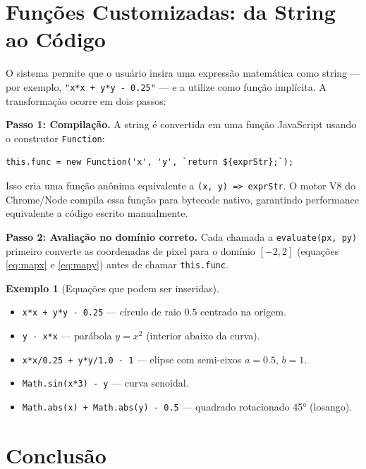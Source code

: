 \documentclass[11pt,a4paper]{article}
\theoremstyle{plain}
\theoremstyle{definition}
\newtheorem{example}[theorem]{Exemplo}
\begin{document}
\section{Funções Customizadas: da String ao Código}
\label{sec:custom}

O sistema permite que o usuário insira uma expressão matemática como string ---
por exemplo, \texttt{"x*x + y*y - 0.25"} --- e a utilize como função implícita.
A transformação ocorre em dois passos:

\textbf{Passo 1: Compilação.} A string é convertida em uma função JavaScript
usando o construtor \texttt{Function}:
\begin{lstlisting}
this.func = new Function('x', 'y', `return ${exprStr};`);
\end{lstlisting}
Isso cria uma função anônima equivalente a \texttt{(x, y) => exprStr}. O motor
V8 do Chrome/Node compila essa função para bytecode nativo, garantindo performance
equivalente a código escrito manualmente.

\textbf{Passo 2: Avaliação no domínio correto.} Cada chamada a
\texttt{evaluate(px, py)} primeiro converte as coordenadas de pixel para o
domínio $[-2, 2]$ (equações \eqref{eq:mapx} e \eqref{eq:mapy}) antes de chamar
\texttt{this.func}.

\begin{example}[Equações que podem ser inseridas]
\begin{itemize}
    \item \texttt{x*x + y*y - 0.25} --- círculo de raio $0.5$ centrado na origem.
    \item \texttt{y - x*x} --- parábola $y = x^2$ (interior abaixo da curva).
    \item \texttt{x*x/0.25 + y*y/1.0 - 1} --- elipse com semi-eixos $a=0.5$, $b=1$.
    \item \texttt{Math.sin(x*3) - y} --- curva senoidal.
    \item \texttt{Math.abs(x) + Math.abs(y) - 0.5} --- quadrado rotacionado 45°
    (losango).
\end{itemize}
\end{example}

\section{Conclusão}
\label{sec:conclusao}
\end{document}
